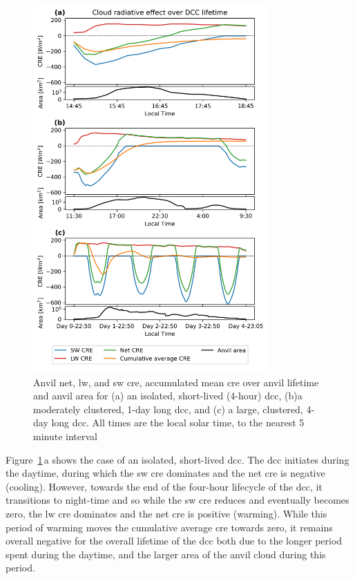 \begin{figure}[tp]
    \centering
    \includegraphics[width=0.8\textwidth]{figures/ch3_10.png}
    \caption[
    Anvil net, \acrshort{lw}, and \acrshort{sw} \acrshort{cre}, accumulated mean \acrshort{cre} over anvil lifetime
    ]{
    Anvil net, \acrshort{lw}, and \acrshort{sw} \acrshort{cre}, accumulated mean \acrshort{cre} over anvil lifetime and anvil area for (a) an isolated, short-lived (4-hour) \acrshort{dcc}, (b)a moderately clustered, 1-day long \acrshort{dcc}, and (c) a large, clustered, 4-day long \acrshort{dcc}. All times are the local solar time, to the nearest 5 minute interval
    }
    \label{fig:cre_lifecycle_examples}
\end{figure}


Figure~\ref{fig:cre_lifecycle_examples}\,a shows the case of an isolated, short-lived \acrshort{dcc}. The \acrshort{dcc}
initiates during the daytime, during which the \acrshort{sw} \acrshort{cre} dominates and the
net \acrshort{cre} is negative (cooling). However, towards the end of the four-hour
lifecycle of the \acrshort{dcc}, it transitions to night-time and so while the \acrshort{sw}
\acrshort{cre} reduces and eventually becomes zero, the \acrshort{lw} \acrshort{cre} dominates and the
net \acrshort{cre} is positive (warming). While this period of warming moves the
cumulative average \acrshort{cre} towards zero, it remains overall negative for the
overall lifetime of the \acrshort{dcc} both due to the longer period spent during
the daytime, and the larger area of the anvil cloud during this period.

